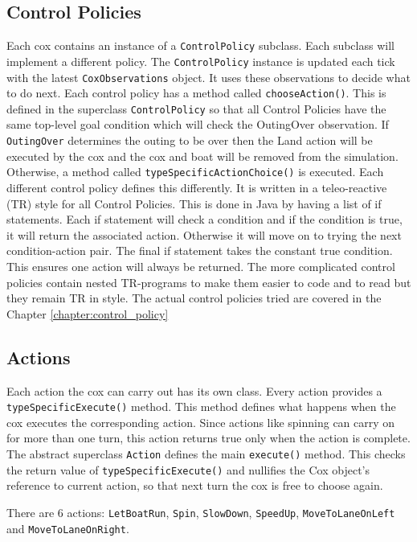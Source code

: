 \subsection{Control Policies}
  Each cox contains an instance of a \texttt{ControlPolicy} subclass. Each subclass will implement a different policy. The \texttt{ControlPolicy} instance is updated each tick with the latest \texttt{CoxObservations} object. It uses these observations to decide what to do next.  Each control policy has a method called \texttt{chooseAction()}. This is defined in the superclass \texttt{ControlPolicy} so that all Control Policies have the same top-level goal condition which will check the OutingOver observation. If \texttt{OutingOver} determines the outing to be over then the Land action will be executed by the cox and the cox and boat will be removed from the simulation. Otherwise, a method called \texttt{typeSpecificActionChoice()} is executed. Each different control policy defines this differently. It is written in a teleo-reactive (TR) style for all Control Policies. This is done in Java by having a list of if statements. Each if statement will check a condition and if the condition is true, it will return the associated action. Otherwise it will move on to trying the next condition-action pair. The final if statement takes the constant true condition. This ensures one action will always be returned. The more complicated control policies contain nested TR-programs to make them easier to code and to read but they remain TR in style. The actual control policies tried are covered in the Chapter \ref{chapter:control_policy}
  
\subsection{Actions}
  Each action the cox can carry out has its own class. Every action provides a \texttt{typeSpecificExecute()} method. This method defines what happens when the cox executes the corresponding action. Since actions like spinning can carry on for more than one turn, this action returns true only when the action is complete. The abstract superclass \texttt{Action} defines the main \texttt{execute()} method. This checks the return value of \texttt{typeSpecificExecute()} and nullifies the Cox object's reference to current action, so that next turn the cox is free to choose again.

  There are 6 actions: \texttt{LetBoatRun}, \texttt{Spin}, \texttt{SlowDown}, \texttt{SpeedUp}, \texttt{MoveToLaneOnLeft} and \texttt{MoveToLaneOnRight}.
  
